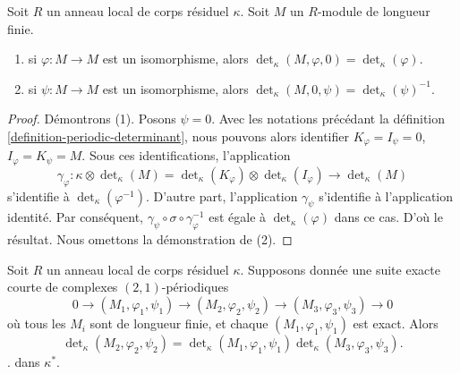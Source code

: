 \begin{lemma}
\label{lemma-periodic-determinant-easy-case}
Soit $R$ un anneau local de corps résiduel $\kappa$.
Soit $M$ un $R$-module de longueur finie.
\begin{enumerate}
\item si $\varphi : M \to M$ est un isomorphisme, alors
$\det_\kappa(M, \varphi, 0) = \det_\kappa(\varphi)$.
\item si $\psi : M \to M$ est un isomorphisme, alors
$\det_\kappa(M, 0, \psi) = \det_\kappa(\psi)^{-1}$.
\end{enumerate}
\end{lemma}

\begin{proof}
Démontrons (1). Posons $\psi = 0$. Avec les notations
précédant la définition \ref{definition-periodic-determinant}, nous pouvons alors identifier
$K_\varphi = I_\psi = 0$, $I_\varphi = K_\psi = M$.
Sous ces identifications, l'application
$$
\gamma_\varphi :
\kappa \otimes \det\nolimits_\kappa(M)
=
\det\nolimits_\kappa(K_\varphi)
\otimes
\det\nolimits_\kappa(I_\varphi)
\longrightarrow
\det\nolimits_\kappa(M)
$$
s'identifie à $\det_\kappa(\varphi^{-1})$. D'autre part,
l'application $\gamma_\psi$ s'identifie à l'application identité. Par conséquent,
$\gamma_\psi \circ \sigma \circ \gamma_\varphi^{-1}$ est égale
à $\det_\kappa(\varphi)$ dans ce cas. D'où le résultat.
Nous omettons la démonstration de (2).
\end{proof}

\begin{lemma}
\label{lemma-periodic-determinant}
Soit $R$ un anneau local de corps résiduel $\kappa$.
Supposons donnée une suite exacte courte de
complexes $(2, 1)$-périodiques
$$
0 \to (M_1, \varphi_1, \psi_1)
\to (M_2, \varphi_2, \psi_2)
\to (M_3, \varphi_3, \psi_3)
\to 0
$$
où tous les $M_i$ sont de longueur finie, et chaque $(M_1, \varphi_1, \psi_1)$ est exact.
Alors
$$
\det\nolimits_\kappa(M_2, \varphi_2, \psi_2) =
\det\nolimits_\kappa(M_1, \varphi_1, \psi_1)
\det\nolimits_\kappa(M_3, \varphi_3, \psi_3).
$$
. dans $\kappa^*$.
\end{lemma}

